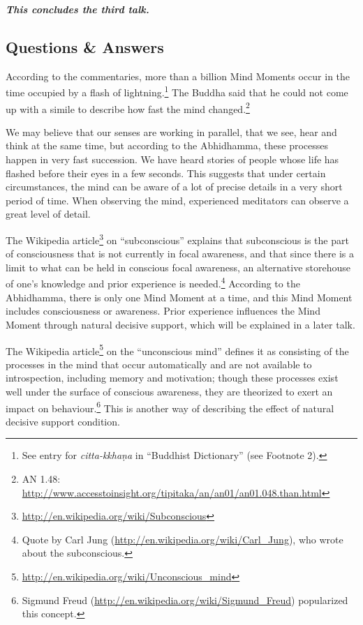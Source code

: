 \begin{center}
\textbf{\textit{This concludes the third talk.}} \\
\end{center}

\newpage

\subsection*{Questions \& Answers}


According to the commentaries, more than a billion Mind Moments occur in the time occupied by a flash of lightning.\footnote{See entry for \textit{citta-kkhaṇa} in “Buddhist Dictionary” (see Footnote 2).} The Buddha said that he could not come up with a simile to describe how fast the mind changed.\footnote{AN 1.48: \url{http://www.accesstoinsight.org/tipitaka/an/an01/an01.048.than.html}} 

We may believe that our senses are working in parallel, that we see, hear and think at the same time, but according to the Abhidhamma, these processes happen in very fast succession. We have heard stories of people whose life has flashed before their eyes in a few seconds. This suggests that under certain circumstances, the mind can be aware of a lot of precise details in a very short period of time. When observing the mind, experienced meditators can observe a great level of detail.


The Wikipedia article\footnote{\url{http://en.wikipedia.org/wiki/Subconscious}} on “subconscious” explains that subconscious is the part of consciousness that is not currently in focal awareness, and that since there is a limit to what can be held in conscious focal awareness, an alternative storehouse of one’s knowledge and prior experience is needed.\footnote{Quote by Carl Jung (\url{http://en.wikipedia.org/wiki/Carl_Jung}), who wrote about the subconscious.} According to the Abhidhamma, there is only one Mind Moment at a time, and this Mind Moment includes consciousness or awareness. Prior experience influences the Mind Moment through natural decisive support, which will be explained in a later talk.

The Wikipedia article\footnote{\url{http://en.wikipedia.org/wiki/Unconscious_mind}} on the “unconscious mind” defines it as consisting of the processes in the mind that occur automatically and are not available to introspection, including memory and motivation; though these processes exist well under the surface of conscious awareness, they are theorized to exert an impact on behaviour.\footnote{Sigmund Freud (\url{http://en.wikipedia.org/wiki/Sigmund_Freud}) popularized this concept.} This is another way of describing the effect of natural decisive support condition.

